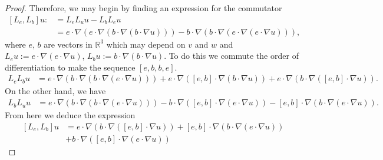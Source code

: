 \documentclass[11pt]{amsart}
\numberwithin{equation}{section}
\begin{document}
\begin{proof}
  Therefore, we may begin by finding an expression for the commutator
  \begin{align*}
    \left[L_{e},L_{b}\right]u :& =L_{e}L_{u}u-L_{b}L_{e}u	\\
    & =e\cdot\nabla\left(e\cdot\nabla\left(b\cdot\nabla\left(b\cdot\nabla u\right)\right)\right)
    -b\cdot\nabla\left(b\cdot\nabla\left(e\cdot\nabla\left(e\cdot\nabla u\right)\right)\right),
  \end{align*}
  where $e$, $b$ are vectors in $\mathbb{R}^{3}$ which may depend on $v$ and $w$ and $L_{e}u:=e\cdot\nabla\left(e\cdot\nabla u\right)$, $L_{b}u:=b\cdot\nabla\left(b\cdot\nabla u\right)$. To do this we commute the order of differentiation to make the sequence $[e,b,b,e]$.
  \begin{align*}
    L_{e}L_{b}u 
    & =e\cdot\nabla\left(b\cdot\nabla\left(b\cdot\nabla\left(e\cdot\nabla u\right)\right)\right)
    +e\cdot\nabla\left([e,b]\cdot\nabla\left(b\cdot\nabla u\right)\right)
    +e\cdot\nabla\left(b\cdot\nabla\left([e,b]\cdot\nabla u\right)\right).
  \end{align*}
  On the other hand, we have
  \begin{align*}
    L_{b}L_{u}u 
    & =e\cdot\nabla\left(b\cdot\nabla\left(b\cdot\nabla\left(e\cdot\nabla u\right)\right)\right)
    -b\cdot\nabla\left([e,b]\cdot\nabla(e\cdot\nabla u)\right)
    -[e,b]\cdot\nabla\left(b\cdot\nabla\left(e\cdot\nabla u\right)\right).
  \end{align*}
  From here we deduce the expression
  \begin{align*}
    \left[L_{e},L_{b}\right]u & =e\cdot\nabla\left(b\cdot\nabla\left([e,b]\cdot\nabla u\right)\right)
    +[e,b]\cdot\nabla\left(b\cdot\nabla\left(e\cdot\nabla u\right)\right)\\
    & +b\cdot\nabla\left([e,b]\cdot\nabla(e\cdot\nabla u)\right)

\end{align*}
\end{proof}
\end{document}
